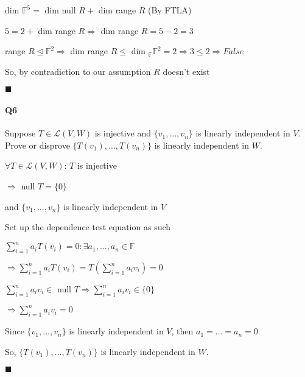 \documentclass{article}
\begin{document}
dim $\mathbb{F}^5 =$ dim null $R + $ dim range $R$ (By FTLA)

$5 = 2 + $ dim range $R \Rightarrow$ dim range $R = 5 - 2 = 3$

range $R \trianglelefteq \mathbb{F}^2 \Rightarrow$ dim range $R \leq$ dim
$_{\mathbb{F}}\mathbb{F}^2 = 2\Rightarrow 3 \leq 2 \Rightarrow False$

So, by contradiction to our assumption $R$ doesn't exist
\vspace{0.618 em}

$\blacksquare$

\newpage

\paragraph{Q6} Suppose $T \in \mathcal{L}(V,W)$ is injective and
$\{v_1, ... ,v_n\}$ is linearly independent in $V$. Prove or disprove
$\{T(v_1), ... ,T(v_n)\}$ is linearly independent in $W$.

\vspace{0.618 em}

$\forall T \in \mathcal{L}(V,W)$: $T$ is injective

$\Rightarrow$ null $T = \{0\}$

and $\{v_1, ... ,v_n\}$ is linearly independent in $V$

Set up the dependence test equation as such

$\sum_{i=1}^na_iT(v_i) = 0: \exists a_1, ... , a_n \in \mathbb{F}$

$\Rightarrow \sum_{i=1}^na_iT(v_i) = T(\sum_{i=1}^na_iv_i) = 0$

$\sum_{i=1}^na_iv_i \in $ null $ T \Rightarrow \sum_{i=1}^na_iv_i \in \{0\}$

$ \Rightarrow \sum_{i=1}^na_iv_i = 0 $

Since $\{v_1, ... ,v_n\}$ is linearly independent in $V$, then $a_1 =
... = a_n = 0$.

So, $\{T(v_1), ... ,T(v_n)\}$ is linearly independent in $W$.

\vspace{0.618 em}

$\blacksquare$
\end{document}
